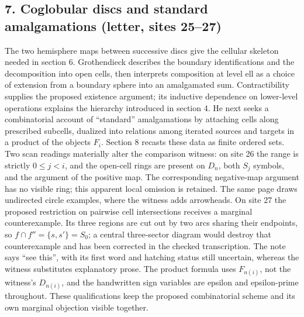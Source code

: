 \documentclass[10pt,oneside]{book}
\begin{document}
\subsection*{7. Coglobular discs and standard amalgamations (letter, sites 25--27)}
The two hemisphere maps between successive discs give the cellular skeleton needed in section 6. Grothendieck describes the boundary identifications and the decomposition into open cells, then interprets composition at level ell as a choice of extension from a boundary sphere into an amalgamated sum. Contractibility supplies the proposed existence argument; its inductive dependence on lower-level operations explains the hierarchy introduced in section 4. He next seeks a combinatorial account of ``standard'' amalgamations by attaching cells along prescribed subcells, dualized into relations among iterated sources and targets in a product of the objects $F_i$. Section 8 recasts these data as finite ordered sets. Two scan readings materially alter the comparison witness: on site 26 the range is strictly $0\leq j<i$, and the open-cell rings are present on $D_n$, both $S_j$ symbols, and the argument of the positive map. The corresponding negative-map argument has no visible ring; this apparent local omission is retained. The same page draws undirected circle examples, where the witness adds arrowheads. On site 27 the proposed restriction on pairwise cell intersections receives a marginal counterexample. Its three regions are cut out by two arcs sharing their endpoints, so $f\cap f''=\{s,s'\}=S_0$; a central three-sector diagram would destroy that counterexample and has been corrected in the checked transcription. The note says ``see this'', with its first word and hatching status still uncertain, whereas the witness substitutes explanatory prose. The product formula uses $F_{n(i)}$, not the witness's $D_{n(i)}$, and the handwritten sign variables are epsilon and epsilon-prime throughout. These qualifications keep the proposed combinatorial scheme and its own marginal objection visible together.
\end{document}
